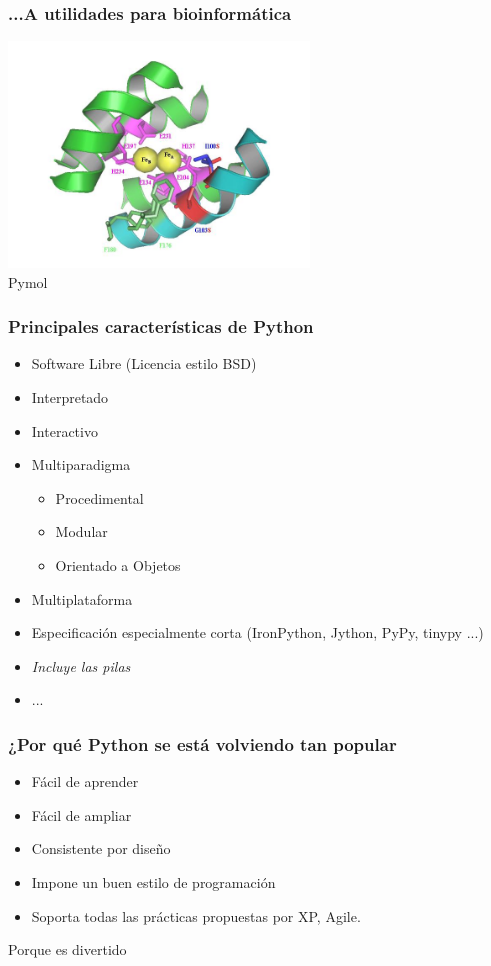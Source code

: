 \documentclass{beamer}
\begin{document}
\begin{frame}
  \frametitle{...A utilidades para bioinformática}
  \begin{center}
    \includegraphics[width=8cm]{files/pymol.jpg}\\
    Pymol
  \end{center}

\end{frame}

\begin{frame}
  \frametitle{Principales características de Python}

  \begin{itemize}
  \item Software Libre (Licencia estilo BSD)
  \item Interpretado
  \item Interactivo
  \item Multiparadigma
    \begin{itemize}
    \item Procedimental
    \item Modular
    \item Orientado a Objetos
    \end{itemize}
  \item Multiplataforma
  \item Especificación especialmente corta (IronPython, Jython, PyPy,
    tinypy ...)
  \item \emph{Incluye las pilas}
  \item ...
  \end{itemize}

\end{frame}

\begin{frame}
  \frametitle{¿Por qué Python se está volviendo tan popular}
  \begin{itemize}
  \item Fácil de aprender
  \item Fácil de ampliar
  \item Consistente por diseño
  \item Impone un buen estilo de programación
  \item Soporta todas las prácticas propuestas por XP, Agile.
  \end{itemize}
  \begin{center}
    Porque es divertido
  \end{center}
\end{frame}
\end{document}
